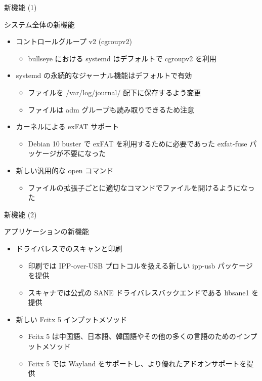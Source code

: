 \begin{frame}{新機能 (1)}

システム全体の新機能
  
\begin{itemize}
\item コントロールグループ v2 (cgroupv2)
  \begin{itemize}
  \item bullseye における systemd はデフォルトで cgroupv2 を利用
  \end{itemize}
\item systemd の永続的なジャーナル機能はデフォルトで有効
  \begin{itemize}
  \item ファイルを /var/log/journal/ 配下に保存するよう変更
  \item ファイルは adm グループも読み取りできるため注意
  \end{itemize}
\item カーネルによる exFAT サポート
  \begin{itemize}
  \item Debian 10 buster で exFAT を利用するために必要であった exfat-fuse パッケージが不要になった
  \end{itemize}
\item 新しい汎用的な open コマンド
  \begin{itemize}
  \item ファイルの拡張子ごとに適切なコマンドでファイルを開けるようになった
  \end{itemize}  
\end{itemize}
  
\end{frame}


\begin{frame}{新機能 (2)}

アプリケーションの新機能
  
\begin{itemize}
\item ドライバレスでのスキャンと印刷
  \begin{itemize}
  \item 印刷では IPP-over-USB プロトコルを扱える新しい ipp-usb パッケージを提供
  \item スキャナでは公式の SANE ドライバレスバックエンドである libsane1 を提供 
  \end{itemize}
\item 新しい Fcitx 5 インプットメソッド
  \begin{itemize}
  \item Fcitx 5 は中国語、日本語、韓国語やその他の多くの言語のためのインプットメソッド
  \item Fcitx 5 では Wayland をサポートし、より優れたアドオンサポートを提供
  \end{itemize}
\end{itemize}
  
\end{frame}



